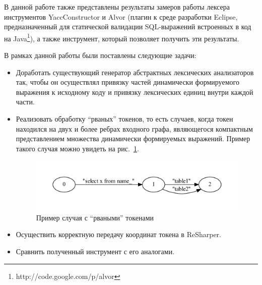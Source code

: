 В данной работе также представлены результаты замеров работы лексера инструментов YaccConstructor и Alvor (плагин к среде разработки Eclipse,
предназначенный для статической валидации SQL-выражений встроенных в код на Java\footnote{http://code.google.com/p/alvor}), а также инструмент, который позволяет получить 
эти результаты.


В рамках данной работы были поставлены следующие задачи:
\begin{itemize}
\item Доработать существующий генератор абстрактных лексических анализаторов так, чтобы он осуществлял привязку частей динамически 
формируемого выражения к исходному коду и привязку лексических единиц внутри каждой части.
\item Реализовать обработку ``рваных'' токенов, то есть случаев, когда токен находился на двух и более ребрах входного графа, являющегося 
компактным представлением множества динамически формируемых выражений. Пример такого случая можно увидеть на рис.~\ref{fig:example_break}.

\begin{figure}[t]
\centering
\includegraphics[width=\textwidth]{Polubelova/example_break}
\caption{Пример случая с ``рваными'' токенами}
\label{fig:example_break} 
\end{figure}

\item Осуществить корректную передачу координат токена в ReSharper.
\item Сравнить полученный инструмент с его аналогами.
\end{itemize}

